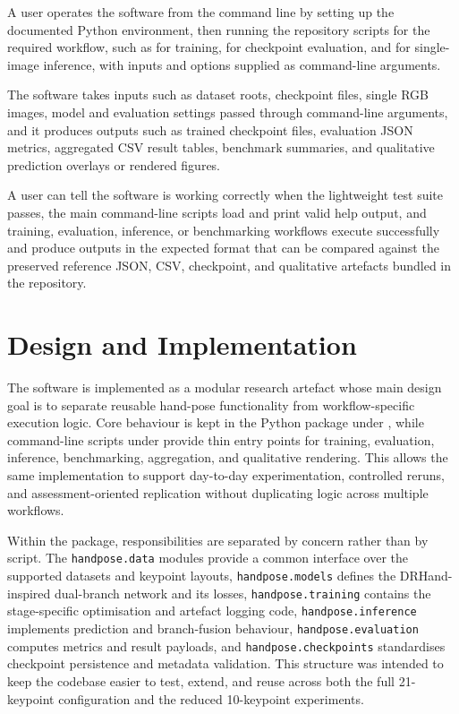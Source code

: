 ﻿\documentclass[11pt,a4paper]{article}
\begin{document}
\medskip

A user operates the software from the command line by setting up the documented Python environment, then running the repository scripts for the required workflow, such as  for training,  for checkpoint evaluation, and  for single-image inference, with inputs and options supplied as command-line arguments.

\medskip

The software takes inputs such as dataset roots, checkpoint files, single RGB images, model and evaluation settings passed through command-line arguments, and it produces outputs such as trained checkpoint files, evaluation JSON metrics, aggregated CSV result tables, benchmark summaries, and qualitative prediction overlays or rendered figures.

\medskip

A user can tell the software is working correctly when the lightweight test suite passes, the main command-line scripts load and print valid help output, and training, evaluation, inference, or benchmarking workflows execute successfully and produce outputs in the expected format that can be compared against the preserved reference JSON, CSV, checkpoint, and qualitative artefacts bundled in the repository.

\section{Design and Implementation}

The software is implemented as a modular research artefact whose main design goal is to separate reusable hand-pose functionality from workflow-specific execution logic. Core behaviour is kept in the Python package under , while command-line scripts under  provide thin entry points for training, evaluation, inference, benchmarking, aggregation, and qualitative rendering. This allows the same implementation to support day-to-day experimentation, controlled reruns, and assessment-oriented replication without duplicating logic across multiple workflows.

\medskip

Within the package, responsibilities are separated by concern rather than by script. The \texttt{handpose.data} modules provide a common interface over the supported datasets and keypoint layouts, \texttt{handpose.models} defines the DRHand-inspired dual-branch network and its losses, \texttt{handpose.training} contains the stage-specific optimisation and artefact logging code, \texttt{handpose.inference} implements prediction and branch-fusion behaviour, \texttt{handpose.evaluation} computes metrics and result payloads, and \texttt{handpose.checkpoints} standardises checkpoint persistence and metadata validation. This structure was intended to keep the codebase easier to test, extend, and reuse across both the full 21-keypoint configuration and the reduced 10-keypoint experiments.
\end{document}
